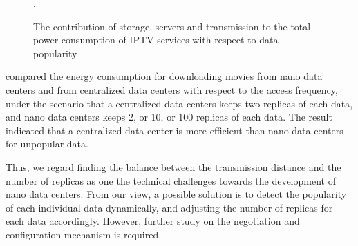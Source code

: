 \begin{figure}[h]
	\fontsize{12}{12} \selectfont
	\centerline{}
	\caption{The contribution of storage, servers and transmission to the total power consumption of IPTV services with respect to data popularity~\cite{iptv}}.
	\label{fig:popularity}
	\normalsize
\end{figure}

\cite{tradeoff} compared the energy consumption for downloading movies from nano data centers and from centralized data centers with respect to the access frequency,
under the scenario that a centralized data centers keeps two replicas of each data,
and nano data centers keeps 2, or 10, or 100 replicas of each data.
The result indicated that a centralized data center is more efficient than nano data centers for unpopular data.

Thus,
we regard finding the balance between the transmission distance and the number of replicas as one the technical challenges towards the development of nano data centers.
From our view,
a possible solution is to detect the popularity of each individual data dynamically,
and adjusting the number of replicas for each data accordingly.
However,
further study on the negotiation and configuration mechanism is required.







